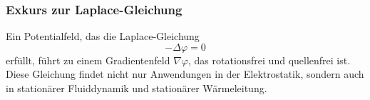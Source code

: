 \subsubsection{Exkurs zur Laplace-Gleichung}
\label{maxwell:section:laplacegleichung_exkurs}
Ein Potentialfeld, das die Laplace-Gleichung
\[
-\Delta\varphi
=
0
\]
erfüllt, führt zu einem Gradientenfeld $\nabla\varphi$, das rotationsfrei und quellenfrei ist.
Diese Gleichung findet nicht nur Anwendungen in der Elektrostatik, sondern auch in stationärer Fluiddynamik und stationärer Wärmeleitung.






